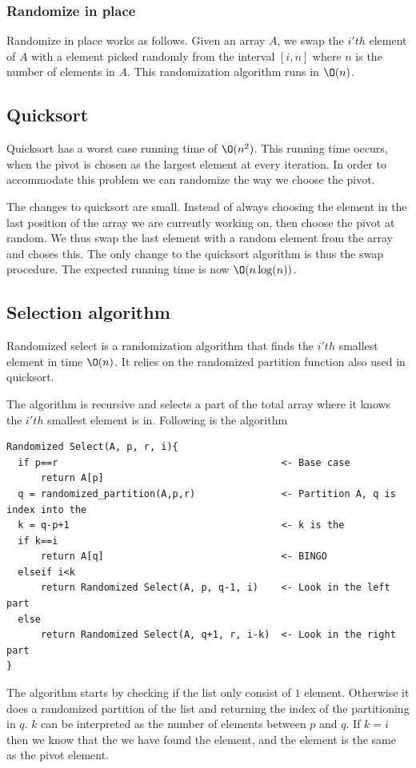 \documentclass[10pt]{article}
\begin{document}
\subsubsection{Randomize in place} %
\label{ssub:randomize_in_place}
Randomize in place works as follows. Given an array $A$, we swap the $i'th$ element of $A$ with a element picked randomly from the interval $[i,n]$ where $n$ is the number of elements in $A$. This randomization algorithm runs in $\O(n)$.



\subsection{Quicksort} %
\label{sub:quicksort}
Quicksort has a worst case running time of $\O(n^2)$. This running time occurs, when the pivot is chosen as the largest element at every iteration. In order to accommodate this problem we can randomize the way we choose the pivot.

The changes to quicksort are small. Instead of always choosing the element in the last position of the array we are currently working on, then choose the pivot at random. We thus swap the last element with a random element from the array and choses this. The only change to the quicksort algorithm is thus the swap procedure. The expected running time is now $\O(n\log(n))$.


\subsection{Selection algorithm} %
\label{sub:selection_algorithm}
Randomized select is a randomization algorithm that finds the $i'th$ smallest element in time $\O(n)$. It relies on the randomized partition function also used in quicksort.

The algorithm is recursive and selects a part of the total array where it knows the $i'th$ smallest element is in. Following is the algorithm
\begin{verbatim}
Randomized Select(A, p, r, i){
  if p==r                                       <- Base case
      return A[p]
  q = randomized_partition(A,p,r)               <- Partition A, q is index into the 
  k = q-p+1                                     <- k is the 
  if k==i
      return A[q]                               <- BINGO
  elseif i<k
      return Randomized Select(A, p, q-1, i)    <- Look in the left part
  else   
      return Randomized Select(A, q+1, r, i-k)  <- Look in the right part
}  
\end{verbatim}
The algorithm starts by checking if the list only consist of $1$ element. Otherwise it does a randomized partition of the list and returning the index of the partitioning in $q$. $k$ can be interpreted as the number of elements between $p$ and $q$. If $k=i$ then we know that the we have found the element, and the element is the same as the pivot element.
\end{document}
